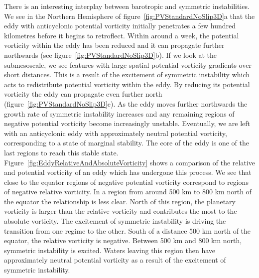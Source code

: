 There is an interesting interplay between barotropic and symmetric instabilities. We see in the Northern Hemisphere of figure~\ref{fig:PVStandardNoSlip3D}a that the eddy with anticyclonic potential vorticity initially penetrates a few hundred kilometres before it begins to retroflect. Within around a week, the potential vorticity within the eddy has been reduced and it can propagate further northwards (see figure~\ref{fig:PVStandardNoSlip3D}b). If we look at the submesoscale, we see features with large spatial potential vorticity gradients over short distances. This is a result of the excitement of symmetric instability which acts to redistribute potential vorticity within the eddy. By reducing its potential vorticity the eddy can propagate even further north (figure~\ref{fig:PVStandardNoSlip3D}c). As the eddy moves further northwards the growth rate of symmetric instability increases and any remaining regions of negative potential vorticity become increasingly unstable. Eventually, we are left with an anticyclonic eddy with approximately neutral potential vorticity, corresponding to a state of marginal stability. The core of the eddy is one of the last regions to reach this stable state. Figure~\ref{fig:EddyRelativeAndAbsoluteVorticity} shows a comparison of the relative and potential vorticity of an eddy which has undergone this process. We see that close to the equator regions of negative potential vorticity correspond to regions of negative relative vorticity. In a region from around 500 km to 800 km north of the equator the relationship is less clear. North of this region, the planetary vorticity is larger than the relative vorticity and contributes the most to the absolute vorticity. The excitement of symmetric instability is driving the transition from one regime to the other. South of a distance 500 km north of the equator, the relative vorticity is negative. Between 500 km and 800 km north, symmetric instability is excited. Waters leaving this region then have approximately neutral potential vorticity as a result of the excitement of symmetric instability.


